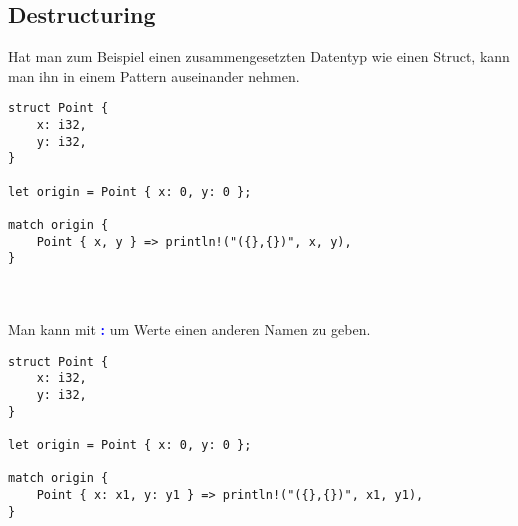 \subsection{Destructuring}
Hat man zum Beispiel einen zusammengesetzten Datentyp wie einen Struct, kann man ihn in einem Pattern auseinander nehmen.

\begin{lstlisting}
struct Point {
    x: i32,
    y: i32,
}

let origin = Point { x: 0, y: 0 };

match origin {
    Point { x, y } => println!("({},{})", x, y),
}
\end{lstlisting}
\hrulefill\\\\
Man kann mit \textbf{\textcolor{blue}{:}} um Werte einen anderen Namen zu geben.

\begin{lstlisting}
struct Point {
    x: i32,
    y: i32,
}

let origin = Point { x: 0, y: 0 };

match origin {
    Point { x: x1, y: y1 } => println!("({},{})", x1, y1),
}
\end{lstlisting}
